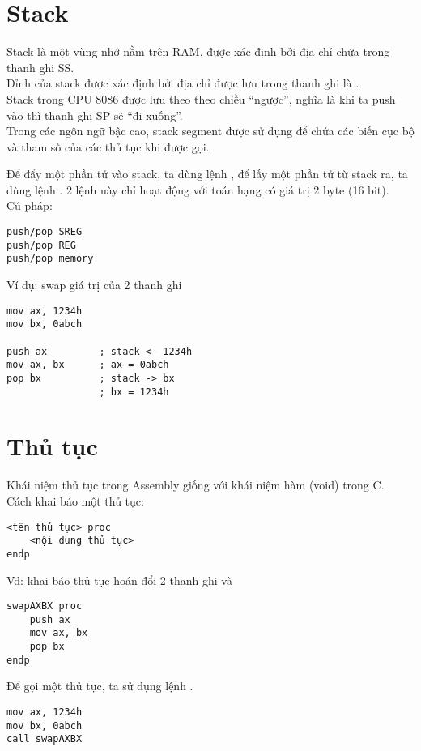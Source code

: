 \documentclass[main.tex]{subfiles}
\begin{document}
\section{Stack}
Stack là một vùng nhớ nằm trên RAM, được xác định bởi địa chỉ chứa trong thanh ghi SS.\\
Đỉnh của stack được xác định bởi địa chỉ được lưu trong thanh ghi  là .\\
Stack trong CPU 8086 được lưu theo theo chiều ``ngược'', nghĩa là khi ta push vào thì thanh ghi SP sẽ ``đi xuống''.\\
Trong các ngôn ngữ bậc cao, stack segment được sử dụng để chứa các biến cục bộ và tham số của các thủ tục khi được gọi.\bigskip

Để đẩy một phần tử vào stack, ta dùng lệnh , để lấy một phần tử từ stack ra, ta dùng lệnh . 2 lệnh này chỉ hoạt động với toán hạng có giá trị 2 byte (16 bit).\\
Cú pháp:
\begin{verbatim}
push/pop SREG 
push/pop REG 
push/pop memory 
\end{verbatim}

Ví dụ: swap giá trị của 2 thanh ghi 
\begin{verbatim}
mov ax, 1234h
mov bx, 0abch

push ax         ; stack <- 1234h 
mov ax, bx      ; ax = 0abch
pop bx          ; stack -> bx 
                ; bx = 1234h
\end{verbatim}

\section{Thủ tục}
Khái niệm thủ tục trong Assembly giống với khái niệm hàm (void) trong C.\\
Cách khai báo một thủ tục:
\begin{verbatim}
<tên thủ tục> proc 
    <nội dung thủ tục>
endp
\end{verbatim}

Vd: khai báo thủ tục hoán đổi 2 thanh ghi  và 
\begin{verbatim}
swapAXBX proc 
    push ax 
    mov ax, bx
    pop bx
endp
\end{verbatim}

Để gọi một thủ tục, ta sử dụng lệnh .
\begin{verbatim}
mov ax, 1234h
mov bx, 0abch
call swapAXBX 
\end{verbatim}
\end{document}
